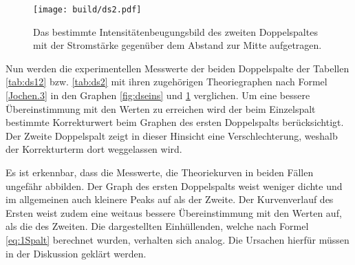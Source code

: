 \begin{figure}
 \centering
 \caption{Das bestimmte Intensitätenbeugungsbild des zweiten Doppelspaltes mit der Stromstärke gegenüber dem Abstand zur Mitte aufgetragen.}
 \texttt{[image: build/ds2.pdf]}
 \label{fig:dszwei}
\end{figure}
Nun werden die experimentellen Messwerte der beiden Doppelspalte der Tabellen \ref{tab:ds12} bzw. \ref{tab:ds2} mit ihren zugehörigen Theoriegraphen nach Formel \eqref{Jochen.3} in den Graphen \ref{fig:dseins} und \ref{fig:dszwei} verglichen.
Um eine bessere Übereinstimmung mit den Werten zu erreichen wird der beim Einzelspalt bestimmte Korrekturwert beim Graphen des ersten Doppelspalts berücksichtigt.
Der Zweite Doppelspalt zeigt in dieser Hinsicht eine Verschlechterung, weshalb der Korrekturterm dort weggelassen wird.

Es ist erkennbar, dass die Messwerte, die Theoriekurven in beiden Fällen ungefähr abbilden. Der Graph des ersten Doppelspalts weist weniger
 dichte und im allgemeinen auch kleinere Peaks auf als der Zweite.
Der Kurvenverlauf des Ersten weist zudem eine weitaus bessere Übereinstimmung mit den Werten auf, als die des Zweiten. Die dargestellten Einhüllenden,
welche nach Formel \eqref{eq:1Spalt} berechnet wurden, verhalten sich analog.
Die Ursachen hierfür müssen in der Diskussion geklärt werden.
